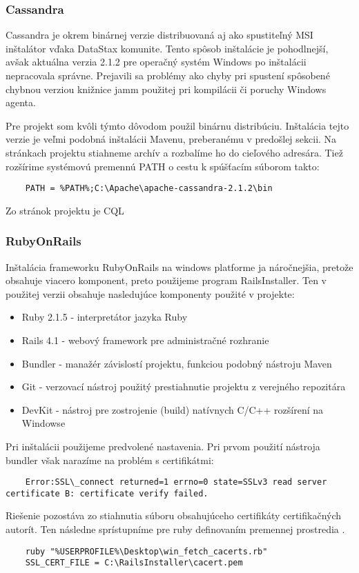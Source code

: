 \subsubsection{Cassandra}	%
	Cassandra je okrem binárnej verzie distribuovaná aj ako spustiteľný MSI inštalátor vďaka DataStax komunite. Tento spôsob inštalácie je pohodlnejší, avšak aktuálna verzia 2.1.2 pre operačný systém Windows po inštalácii nepracovala správne. Prejavili sa problémy ako chyby pri spustení spôsobené chybnou verziou knižnice jamm použitej pri kompilácii či poruchy Windows agenta.
		
	Pre projekt som kvôli týmto dôvodom použil binárnu distribúciu. Inštalácia tejto verzie je veľmi podobná inštalácii Mavenu, preberanému v predošlej sekcii. Na stránkach projektu stiahneme archív a rozbalíme ho do cieľového adresára. Tiež rozšírime systémovú premennú PATH o cestu k spúšťacím súborom takto:
	\begin{lstlisting}
	PATH = %PATH%;C:\Apache\apache-cassandra-2.1.2\bin
	\end{lstlisting}
	
	Zo stránok projektu je CQL

\subsubsection{RubyOnRails}	%
	Inštalácia frameworku RubyOnRails na windows platforme ja náročnejšia, pretože obsahuje viacero komponent, preto použijeme program RailsInstaller. Ten v použitej verzii obsahuje nasledujúce komponenty použité v projekte:
	\begin{itemize}
		\item Ruby 2.1.5 - interpretátor jazyka Ruby
		\item Rails 4.1 - webový framework pre administračné rozhranie
		\item Bundler - manažér závislostí projektu, funkciou podobný nástroju Maven
		\item Git - verzovací nástroj použitý prestiahnutie projektu z verejného repozitára
		\item DevKit - nástroj pre zostrojenie (build) natívnych C/C++ rozšírení na Windowse
	\end{itemize}

	Pri inštalácii použijeme predvolené nastavenia. Pri prvom použití nástroja bundler však narazíme na problém s certifikátmi:
	\begin{lstlisting}
	Error:SSL\_connect returned=1 errno=0 state=SSLv3 read server certificate B: certificate verify failed.
	\end{lstlisting}
	Riešenie pozostáva zo stiahnutia súboru obsahujúceho certifikáty certifikačných autorít. Ten následne sprístupníme pre ruby definovaním premennej prostredia \cite{web:certificate-fix}.
	\begin{lstlisting}
	ruby "%USERPROFILE%\Desktop\win_fetch_cacerts.rb"
	SSL_CERT_FILE = C:\RailsInstaller\cacert.pem
	\end{lstlisting}
		
